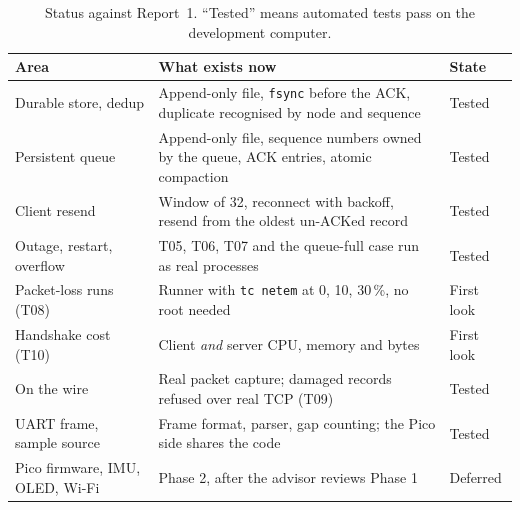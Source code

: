 \documentclass[11pt,a4paper]{article}
\newcommand{\prog}[1]{\texttt{#1}}
\begin{document}
\begin{table}[!htbp]
\centering
\caption{Status against Report~1. ``Tested'' means automated tests pass on the development computer.}
\label{tab:since}
\small
\begin{tabularx}{\linewidth}{@{}lXl@{}}
\toprule
Area & What exists now & State \\
\midrule
Durable store, dedup & Append-only file, \prog{fsync} before the ACK, duplicate recognised by node and sequence & Tested \\
Persistent queue & Append-only file, sequence numbers owned by the queue, ACK entries, atomic compaction & Tested \\
Client resend & Window of 32, reconnect with backoff, resend from the oldest un-ACKed record & Tested \\
Outage, restart, overflow & T05, T06, T07 and the queue-full case run as real processes & Tested \\
Packet-loss runs (T08) & Runner with \prog{tc netem} at 0, 10, 30\,\%, no root needed & First look \\
Handshake cost (T10) & Client \emph{and} server CPU, memory and bytes & First look \\
On the wire & Real packet capture; damaged records refused over real TCP (T09) & Tested \\
UART frame, sample source & Frame format, parser, gap counting; the Pico side shares the code & Tested \\
Pico firmware, IMU, OLED, Wi-Fi & Phase 2, after the advisor reviews Phase 1 & Deferred \\
\bottomrule
\end{tabularx}
\end{table}
\end{document}
